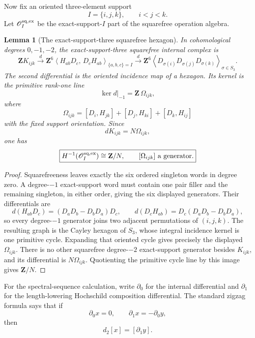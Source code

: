 \documentclass[11pt]{article}
\newtheorem{lemma}[theorem]{Lemma}
\theoremstyle{remark}
\newcommand{\Z}{\mathbf Z}
\begin{document}
Now fix an oriented three-element support
\[
 I=\{i,j,k\},\qquad i<j<k.
\]
Let \(\mathscr O_{I}^{\rm sq,ex}\) be the exact-support-\(I\) part of the
squarefree operation algebra.

\begin{lemma}[The exact-support-three squarefree hexagon]
\label{P2M-lem:v26-three-support-hexagon}
In cohomological degrees \(0,-1,-2\), the exact-support-three squarefree
internal complex is
\begin{equation}
 \boxed{
 \Z K_{ijk}
 \xrightarrow{\ d\ }
 \Z^{6}\!
 \left\langle
   H_{ab}D_c,\,
   D_cH_{ab}
 \right\rangle_{\{a,b,c\}=I}
 \xrightarrow{\ d\ }
 \Z^{6}\!
 \left\langle
   D_{\sigma(i)}D_{\sigma(j)}D_{\sigma(k)}
 \right\rangle_{\sigma\in S_3}.}
\end{equation}
The second differential is the oriented incidence map of a hexagon.  Its
kernel is the primitive rank-one line
\begin{equation}
 \boxed{
 \ker d|_{-1}
 =
 \Z\,\Omega_{ijk},}
\end{equation}
where
\[
 \Omega_{ijk}
 =
 [D_i,H_{jk}]
 +[D_j,H_{ki}]
 +[D_k,H_{ij}]
\]
with the fixed support orientation.  Since
\[
 dK_{ijk}=N\Omega_{ijk},
\]
one has
\begin{equation}
 \boxed{
 H^{-1}\!\left(\mathscr O_I^{\rm sq,ex}\right)
 \cong
 \Z/N,
 \qquad
 [\Omega_{ijk}]\text{ a generator}.}
\end{equation}
\end{lemma}

\begin{proof}
Squarefreeness leaves exactly the six ordered singleton words in degree zero.
A degree-\(-1\) exact-support word must contain one pair filler and the
remaining singleton, in either order, giving the six displayed generators.
Their differentials are
\[
 d(H_{ab}D_c)
 =
 (D_aD_b-D_bD_a)D_c,
 \qquad
 d(D_cH_{ab})
 =
 D_c(D_aD_b-D_bD_a),
\]
so every degree-\(-1\) generator joins two adjacent permutations of
\((i,j,k)\).  The resulting graph is the Cayley hexagon of \(S_3\), whose
integral incidence kernel is one primitive cycle.  Expanding that oriented
cycle gives precisely the displayed \(\Omega_{ijk}\).
There is no other squarefree degree-\(-2\) exact-support generator besides
\(K_{ijk}\), and its differential is \(N\Omega_{ijk}\).  Quotienting the
primitive cycle line by this image gives \(\Z/N\).
\end{proof}

For the spectral-sequence calculation, write
\(\partial_0\) for the internal differential and
\(\partial_1\) for the length-lowering Hochschild composition differential.
The standard zigzag formula says that if
\[
 \partial_0x=0,
 \qquad
 \partial_1x=-\partial_0y,
\]
then
\begin{equation}\label{P2M-eq:v26-d2-zigzag-formula}
 d_2[x]=[\partial_1y].
\end{equation}
\end{document}
